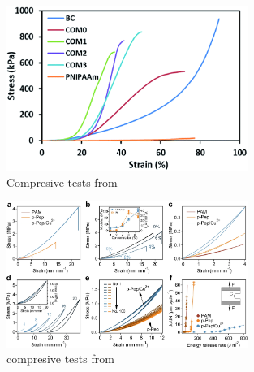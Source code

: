 \begin{figure}[ht!]
    \centering
    \includegraphics[width=0.7\textwidth]{figs/mechResponse/7.png}
    \caption{Compresive tests from\citep{wangRapidUniaxialActuation2018}}
\end{figure}

\begin{figure}[ht!]
    \centering
    \includegraphics[width=0.7\textwidth]{figs/mechResponse/8.png}
    \caption{compresive tests from\citep{xuestrongtoughrapidrecovery2023}}
\end{figure}




